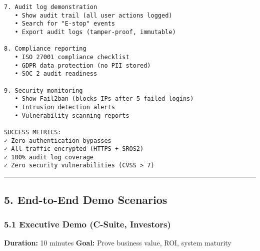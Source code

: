 \documentclass[
]{article}
\begin{document}
\begin{verbatim}
7. Audit log demonstration
   • Show audit trail (all user actions logged)
   • Search for "E-stop" events
   • Export audit logs (tamper-proof, immutable)

8. Compliance reporting
   • ISO 27001 compliance checklist
   • GDPR data protection (no PII stored)
   • SOC 2 audit readiness

9. Security monitoring
   • Show Fail2ban (blocks IPs after 5 failed logins)
   • Intrusion detection alerts
   • Vulnerability scanning reports

SUCCESS METRICS:
✓ Zero authentication bypasses
✓ All traffic encrypted (HTTPS + SROS2)
✓ 100% audit log coverage
✓ Zero security vulnerabilities (CVSS > 7)
\end{verbatim}

\begin{center}\rule{0.5\linewidth}{0.5pt}\end{center}

\hypertarget{end-to-end-demo-scenarios}{%
\subsection{5. End-to-End Demo
Scenarios}\label{end-to-end-demo-scenarios}}

\hypertarget{executive-demo-c-suite-investors}{%
\subsubsection{5.1 Executive Demo (C-Suite,
Investors)}\label{executive-demo-c-suite-investors}}

\textbf{Duration:} 10 minutes \textbf{Goal:} Prove business value, ROI,
system maturity
\end{document}
